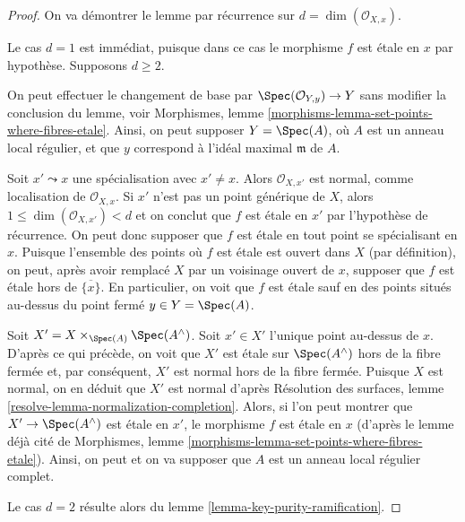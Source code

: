 \begin{proof}
On va démontrer le lemme par récurrence sur $d = \dim(\mathcal{O}_{X, x})$.

\medskip\noindent
Le cas $d = 1$ est immédiat, puisque dans ce cas le morphisme
$f$ est \'etale en $x$ par hypothèse. Supposons $d \geq 2$.

\medskip\noindent
On peut effectuer le changement de base par $\Spec(\mathcal{O}_{Y, y}) \to Y$
sans modifier la conclusion du lemme, voir
Morphismes, lemme \ref{morphisms-lemma-set-points-where-fibres-etale}.
Ainsi, on peut supposer $Y = \Spec(A)$, où $A$ est un anneau local régulier,
et que $y$ correspond à l'idéal maximal $\mathfrak m$ de $A$.

\medskip\noindent
Soit $x' \leadsto x$ une spécialisation avec $x' \not = x$.
Alors $\mathcal{O}_{X, x'}$ est normal, comme localisation de
$\mathcal{O}_{X, x}$. Si $x'$ n'est pas un point générique de $X$,
alors $1 \leq \dim(\mathcal{O}_{X, x'}) < d$ et on conclut que
$f$ est \'etale en $x'$ par l'hypothèse de récurrence.
On peut donc supposer que $f$ est \'etale en tout point se spécialisant en
$x$. Puisque l'ensemble des points où $f$ est \'etale est ouvert dans $X$
(par définition), on peut, après avoir remplacé $X$ par un voisinage ouvert de $x$,
supposer que $f$ est \'etale hors de $\overline{\{x\}}$.
En particulier, on voit que $f$ est \'etale sauf en des points
situés au-dessus du point fermé $y \in Y = \Spec(A)$.

\medskip\noindent
Soit $X' = X \times_{\Spec(A)} \Spec(A^\wedge)$. Soit $x' \in X'$
l'unique point au-dessus de $x$. D'après ce qui précède, on voit que
$X'$ est \'etale sur $\Spec(A^\wedge)$ hors de la fibre fermée et, par conséquent,
$X'$ est normal hors de la fibre fermée. Puisque $X$ est normal,
on en déduit que $X'$ est normal d'après
Résolution des surfaces, lemme \ref{resolve-lemma-normalization-completion}.
Alors, si l'on peut montrer que $X' \to \Spec(A^\wedge)$ est \'etale en $x'$,
le morphisme $f$ est \'etale en $x$ (d'après le lemme déjà cité de
Morphismes, lemme \ref{morphisms-lemma-set-points-where-fibres-etale}).
Ainsi, on peut et on va supposer que $A$ est un anneau local régulier complet.

\medskip\noindent
Le cas $d = 2$ résulte alors du lemme \ref{lemma-key-purity-ramification}.


\end{proof}
